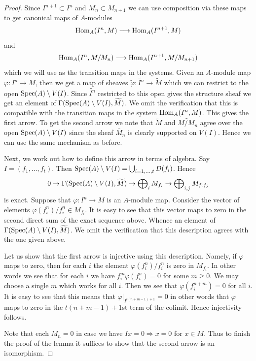 \begin{proof}
Since $I^{n + 1} \subset I^n$ and $M_n \subset M_{n + 1}$ we can
use composition via these maps to get canonical maps of $A$-modules
$$
\mathop{\mathrm{Hom}}\nolimits_A(I^n, M)
\longrightarrow
\mathop{\mathrm{Hom}}\nolimits_A(I^{n + 1}, M)
$$
and
$$
\mathop{\mathrm{Hom}}\nolimits_A(I^n, M/M_n)
\longrightarrow
\mathop{\mathrm{Hom}}\nolimits_A(I^{n + 1}, M/M_{n + 1})
$$
which we will use as the transition maps in the systems. Given an
$A$-module map $\varphi : I^n \to M$, then we get a map of
sheaves $\widetilde{\varphi} : \widetilde{I^n} \to \widetilde{M}$
which we can restrict to the open $\mathop{\mathrm{Spec}}(A) \setminus V(I)$.
Since $\widetilde{I^n}$ restricted to this open gives the structure
sheaf we get an element of
$\Gamma(\mathop{\mathrm{Spec}}(A) \setminus V(I), \widetilde{M})$.
We omit the verification that this is compatible with the transition maps
in the system $\mathop{\mathrm{Hom}}\nolimits_A(I^n, M)$. This gives the first arrow.
To get the second arrow we note that
$\widetilde{M}$ and $\widetilde{M/M_n}$ agree over the open
$\mathop{\mathrm{Spec}}(A) \setminus V(I)$ since the sheaf $\widetilde{M_n}$
is clearly supported on $V(I)$. Hence we can use the same mechanism
as before.

\medskip\noindent
Next, we work out how to define this arrow in terms of algebra.
Say $I = (f_1, \ldots, f_t)$. Then
$\mathop{\mathrm{Spec}}(A) \setminus V(I) = \bigcup_{i = 1, \ldots, t} D(f_i)$.
Hence
$$
0 \to
\Gamma(\mathop{\mathrm{Spec}}(A) \setminus V(I), \widetilde{M}) \to
\bigoplus\nolimits_i M_{f_i} \to
\bigoplus\nolimits_{i, j} M_{f_if_j}
$$
is exact. Suppose that $\varphi : I^n \to M$ is an $A$-module map.
Consider the vector of elements $\varphi(f_i^n)/f_i^n \in M_{f_i}$.
It is easy to see that this vector maps to zero in the
second direct sum of the exact sequence above. Whence an element
of $\Gamma(\mathop{\mathrm{Spec}}(A) \setminus V(I), \widetilde{M})$.
We omit the verification that this description agrees with the one
given above.

\medskip\noindent
Let us show that the first arrow is injective using this description.
Namely, if $\varphi$ maps to zero, then for each $i$ the element
$\varphi(f_i^n)/f_i^n$ is zero in $M_{f_i}$. In other words we
see that for each $i$ we have $f_i^m\varphi(f_i^n) = 0$ for some $m \geq 0$.
We may choose a single $m$ which works for all $i$. Then we see that
$\varphi(f_i^{n + m}) = 0$ for all $i$. It is easy to see that
this means that $\varphi|_{I^{t(n + m - 1) + 1}} = 0$ in other
words that $\varphi$ maps to zero in the $t(n + m - 1) + 1$st
term of the colimit. Hence injectivity follows.

\medskip\noindent
Note that each $M_n = 0$ in case we have
$Ix = 0 \Rightarrow x = 0$ for $x \in M$. Thus
to finish the proof of the lemma it suffices to show that
the second arrow is an isomorphism.


\end{proof}
